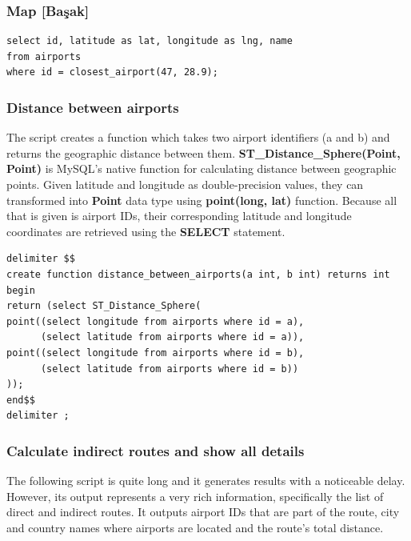 \documentclass[12pt]{article}
\begin{document}
\subsubsection{Map [Başak]}
\label{sec:orgc53cd6c}
\begin{verbatim}
select id, latitude as lat, longitude as lng, name
from airports	 
where id = closest_airport(47, 28.9);
\end{verbatim}

\subsubsection{Distance between airports}
\label{sec:org1f25cb5}
The script creates a function which takes two airport identifiers (a and b) and returns the geographic distance between them. \textbf{ST\_Distance\_Sphere(Point, Point)} is MySQL's native function for calculating distance between geographic points. Given latitude and longitude as double-precision values, they can transformed into \textbf{Point} data type using \textbf{point(long, lat)} function. Because all that is given is airport IDs, their corresponding latitude and longitude coordinates are retrieved using the \textbf{SELECT} statement.
\begin{verbatim}
delimiter $$
create function distance_between_airports(a int, b int) returns int
begin
return (select ST_Distance_Sphere(
point((select longitude from airports where id = a),
      (select latitude from airports where id = a)),
point((select longitude from airports where id = b),
      (select latitude from airports where id = b))			  
)); 
end$$
delimiter ; 
\end{verbatim}

\subsubsection{Calculate indirect routes and show all details}
\label{sec:orgf5f2e55}
The following script is quite long and it generates results with a noticeable delay. However, its output represents a very rich information, specifically the list of direct and indirect routes. It outputs airport IDs that are part of the route, city and country names where airports are located and the route's total distance.
\end{document}
